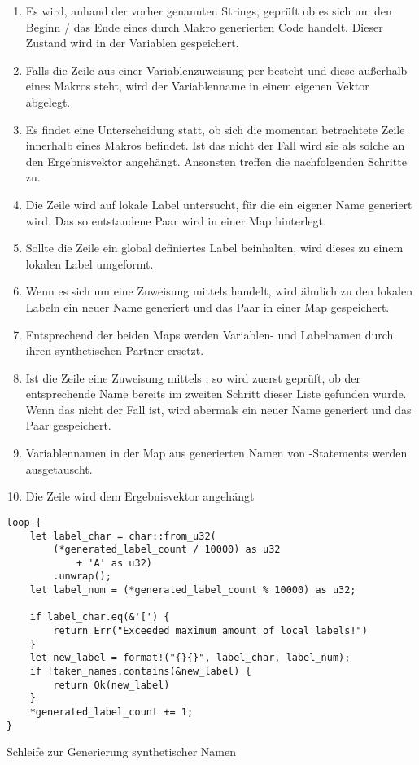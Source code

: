 \begin{enumerate}
	\item Es wird, anhand der vorher genannten Strings, geprüft ob es sich um den Beginn / das Ende eines durch Makro generierten Code handelt. Dieser Zustand wird in der Variablen  gespeichert.
	\item Falls die Zeile aus einer Variablenzuweisung per  besteht und diese außerhalb eines Makros steht, wird der Variablenname in einem eigenen Vektor abgelegt.
	\item Es findet eine Unterscheidung statt, ob sich die momentan betrachtete Zeile innerhalb eines Makros befindet. Ist das nicht der Fall wird sie als solche an den Ergebnisvektor angehängt. Ansonsten treffen die nachfolgenden Schritte zu.
	\item Die Zeile wird auf lokale Label untersucht, für die ein eigener Name generiert wird. Das so entstandene Paar wird in einer Map hinterlegt.
	\item Sollte die Zeile ein global definiertes Label beinhalten, wird dieses zu einem lokalen Label umgeformt.
	\item Wenn es sich um eine Zuweisung mittels  handelt, wird ähnlich zu den lokalen Labeln ein neuer Name generiert und das Paar in einer Map gespeichert.
	\item Entsprechend der beiden Maps werden Variablen- und Labelnamen durch ihren synthetischen Partner ersetzt.
	\item Ist die Zeile eine Zuweisung mittels , so wird zuerst geprüft, ob der entsprechende Name bereits im zweiten Schritt dieser Liste gefunden wurde. Wenn das nicht der Fall ist, wird abermals ein neuer Name generiert und das Paar gespeichert.
	\item Variablennamen in der Map aus generierten Namen von -Statements werden ausgetauscht.
	\item Die Zeile wird dem Ergebnisvektor angehängt
\end{enumerate}

\begin{listing}[th]
\begin{verbatim}
loop {
    let label_char = char::from_u32(
        (*generated_label_count / 10000) as u32
            + 'A' as u32)
        .unwrap();
    let label_num = (*generated_label_count % 10000) as u32;

    if label_char.eq(&'[') {
        return Err("Exceeded maximum amount of local labels!")
    }
    let new_label = format!("{}{}", label_char, label_num);
    if !taken_names.contains(&new_label) {
        return Ok(new_label)
    }
    *generated_label_count += 1;
}
\end{verbatim}
\label{lst:name-generation}
\caption{Schleife zur Generierung synthetischer Namen}
\end{listing}

